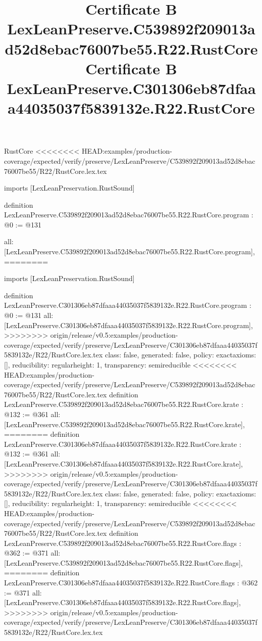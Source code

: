 \begin{lexlean}{RustCore}
<<<<<<<< HEAD:examples/production-coverage/expected/verify/preserve/LexLeanPreserve/C539892f209013ad52d8ebac76007be55/R22/RustCore.lex.tex
\title{Certificate B LexLeanPreserve.C539892f209013ad52d8ebac76007be55.R22.RustCore}
\begin{coremodule}
imports [LexLeanPreservation.RustSound]

definition LexLeanPreserve.C539892f209013ad52d8ebac76007be55.R22.RustCore.program : @0 := @131 {
  all: [LexLeanPreserve.C539892f209013ad52d8ebac76007be55.R22.RustCore.program],
========
\title{Certificate B LexLeanPreserve.C301306eb87dfaaa44035037f5839132e.R22.RustCore}
\begin{coremodule}
imports [LexLeanPreservation.RustSound]

definition LexLeanPreserve.C301306eb87dfaaa44035037f5839132e.R22.RustCore.program : @0 := @131 {
  all: [LexLeanPreserve.C301306eb87dfaaa44035037f5839132e.R22.RustCore.program],
>>>>>>>> origin/release/v0.5:examples/production-coverage/expected/verify/preserve/LexLeanPreserve/C301306eb87dfaaa44035037f5839132e/R22/RustCore.lex.tex
  class: false,
  generated: false,
  policy: exact{axioms: []},
  reducibility: regular{height: 1},
  transparency: semireducible
}
<<<<<<<< HEAD:examples/production-coverage/expected/verify/preserve/LexLeanPreserve/C539892f209013ad52d8ebac76007be55/R22/RustCore.lex.tex
definition LexLeanPreserve.C539892f209013ad52d8ebac76007be55.R22.RustCore.krate : @132 := @361 {
  all: [LexLeanPreserve.C539892f209013ad52d8ebac76007be55.R22.RustCore.krate],
========
definition LexLeanPreserve.C301306eb87dfaaa44035037f5839132e.R22.RustCore.krate : @132 := @361 {
  all: [LexLeanPreserve.C301306eb87dfaaa44035037f5839132e.R22.RustCore.krate],
>>>>>>>> origin/release/v0.5:examples/production-coverage/expected/verify/preserve/LexLeanPreserve/C301306eb87dfaaa44035037f5839132e/R22/RustCore.lex.tex
  class: false,
  generated: false,
  policy: exact{axioms: []},
  reducibility: regular{height: 1},
  transparency: semireducible
}
<<<<<<<< HEAD:examples/production-coverage/expected/verify/preserve/LexLeanPreserve/C539892f209013ad52d8ebac76007be55/R22/RustCore.lex.tex
definition LexLeanPreserve.C539892f209013ad52d8ebac76007be55.R22.RustCore.flags : @362 := @371 {
  all: [LexLeanPreserve.C539892f209013ad52d8ebac76007be55.R22.RustCore.flags],
========
definition LexLeanPreserve.C301306eb87dfaaa44035037f5839132e.R22.RustCore.flags : @362 := @371 {
  all: [LexLeanPreserve.C301306eb87dfaaa44035037f5839132e.R22.RustCore.flags],
>>>>>>>> origin/release/v0.5:examples/production-coverage/expected/verify/preserve/LexLeanPreserve/C301306eb87dfaaa44035037f5839132e/R22/RustCore.lex.tex
}}}
\end{coremodule}}
\end{coremodule}
\end{lexlean}
